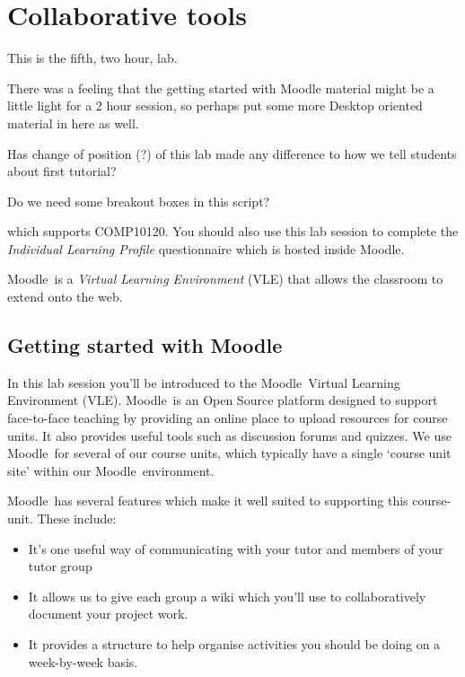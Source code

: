 \chapter{Collaborative tools}
\newcommand{\moodle}{\textsf{Moodle}}
\newcommand{\Moodle}{\textsf{Moodle}}

\minitoc


\begin{note}
  This is the fifth, two hour, lab.

  There was a feeling that the getting started with Moodle material might be a little light for a 2 hour session, so perhaps put some more Desktop oriented material in here as well.

  Has change of position (?) of this lab made any difference to how we tell students about first tutorial?

  Do we need some breakout boxes in this script?
  
  
  which supports COMP10120. You should also use this lab session to complete the \emph{Individual Learning Profile} questionnaire which is hosted inside \moodle.

\moodle\ is a \emph{Virtual Learning Environment} (VLE) that allows the classroom to extend onto the web.
  
\end{note}


\section{Getting started with \moodle}
\label{sec:introduction-moodle}

In this lab session you'll be introduced to the \moodle\ Virtual Learning Environment (VLE). \moodle\ is an Open Source platform designed to support face-to-face teaching by providing an online place to upload resources for course units. It also provides useful  tools such as discussion forums and quizzes. We use \moodle\ for several of our course units, which typically have a single `course unit site' within our \moodle\ environment.

\moodle\ has several features which make it well suited to supporting this course-unit. These include:
\begin{itemize}
\item It's one useful way of communicating with your tutor and members of your tutor group 
\item It allows us to give each group a wiki which you'll use to collaboratively document your project work.
\item It provides a structure to help organise activities you should be doing on a week-by-week basis.
\end{itemize}

